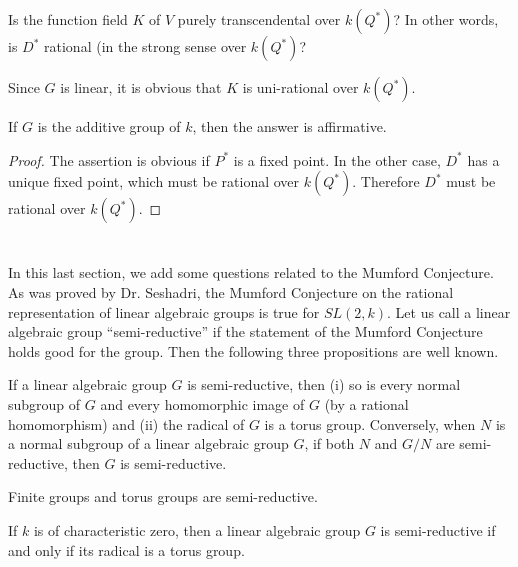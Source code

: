 \begin{question}\label{art16-ques4.1}
Is the function field $K$ of $V$ purely transcendental over $k(Q^{*})$? In other words, is $D^{*}$ rational (in the strong sense over $k(Q^{*})$?
\end{question}

Since $G$ is linear, it is obvious that $K$ is uni-rational over $k(Q^{*})$.

\begin{proposition}\label{art16-prop4.2}
If $G$ is the additive group of $k$, then the answer is affirmative.
\end{proposition}

\begin{proof}
The assertion is obvious if $P^{*}$ is a fixed point. In the other case, $D^{*}$ has a unique fixed point, which must be rational over $k(Q^{*})$. Therefore $D^{*}$ must be rational over $k(Q^{*})$.
\end{proof}

\section{}\label{art16-sec5}
In this last section, we add some questions related to the Mumford Conjecture. As was proved by Dr. Seshadri, the Mumford Conjecture on the rational representation of linear algebraic groups is true for $SL(2,k)$. Let us call a linear algebraic group ``semi-reductive'' if the statement of the Mumford Conjecture holds good for the group. Then the following three propositions are well known.

\begin{proposition}\label{art16-prop5.1}
If a linear algebraic group $G$ is semi-reductive, then {\rm(i)} so is every normal subgroup of $G$ and every homomorphic image of $G$ (by a rational homomorphism) and {\rm(ii)} the radical of $G$ is a torus group. Conversely, when $N$ is a normal subgroup of a linear algebraic group $G$, if both $N$ and $G/N$ are semi-reductive, then $G$ is semi-reductive.
\end{proposition}

\begin{proposition}\label{art16-prop5.2}
Finite groups and torus groups are semi-reductive.
\end{proposition}

\begin{proposition}\label{art16-prop5.3}
If $k$ is of characteristic zero, then a linear algebraic group $G$ is semi-reductive if and only if its radical is a torus group.
\end{proposition}

